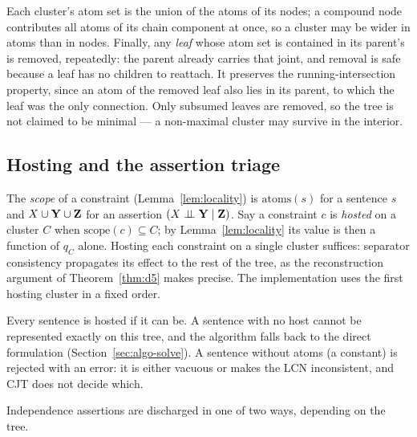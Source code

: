 \documentclass{article} %
\newcommand{\indep}{\perp\!\!\!\perp}
\newcommand{\atoms}{\mathrm{atoms}}
\newcommand{\scope}{\mathrm{scope}}
\begin{document}
Each cluster's atom set is the union of the atoms of its nodes; a compound
node contributes all atoms of its chain component at once, so a cluster may be
wider in atoms than in nodes. Finally, any \emph{leaf} whose atom set is contained
in its parent's is removed, repeatedly: the parent already carries that joint, and
removal is safe because a leaf has no children to reattach. It preserves the
running-intersection property, since an atom of the removed leaf also lies in
its parent, to which the leaf was the only connection. Only subsumed leaves are
removed, so the tree is not claimed to be minimal --- a non-maximal cluster may
survive in the interior.

\subsection{Hosting and the assertion triage}\label{sec:algo-host}

The \emph{scope} of a constraint (Lemma~\ref{lem:locality}) is $\atoms(s)$ for a
sentence $s$ and $X\cup\mathbf{Y}\cup\mathbf{Z}$ for an assertion $(X\indep\bY\mid\bZ)$. Say a
constraint $c$ is \emph{hosted} on a cluster $C$ when $\scope(c)\subseteq C$; by
Lemma~\ref{lem:locality} its value is then a function of $q_C$ alone. Hosting
each constraint on a single cluster suffices: separator consistency propagates its
effect to the rest of the tree, as the reconstruction argument of
Theorem~\ref{thm:d5} makes precise. The implementation uses the first hosting
cluster in a fixed order.

Every sentence is hosted if it can be. A sentence with no host cannot be
represented exactly on this tree, and the algorithm falls back to the direct
formulation (Section~\ref{sec:algo-solve}). A sentence without atoms (a constant)
is rejected with an error: it is either vacuous or makes the LCN inconsistent, and
CJT does not decide which.

Independence assertions are discharged in one of two ways, depending on the
tree.
\end{document}
